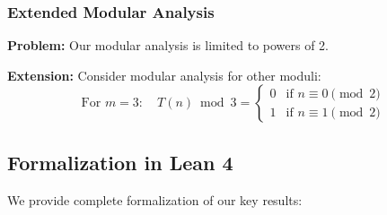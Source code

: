 \documentclass[11pt,a4paper]{article}
\begin{document}
\subsubsection{Extended Modular Analysis}

\textbf{Problem:} Our modular analysis is limited to powers of 2.

\textbf{Extension:} Consider modular analysis for other moduli:
\begin{equation}
\text{For } m = 3: \quad T(n) \bmod 3 = \begin{cases}
0 & \text{if } n \equiv 0 \pmod{2} \\
1 & \text{if } n \equiv 1 \pmod{2}
\end{cases}
\end{equation}

\subsection{Formalization in Lean 4}

We provide complete formalization of our key results:
\end{document}
